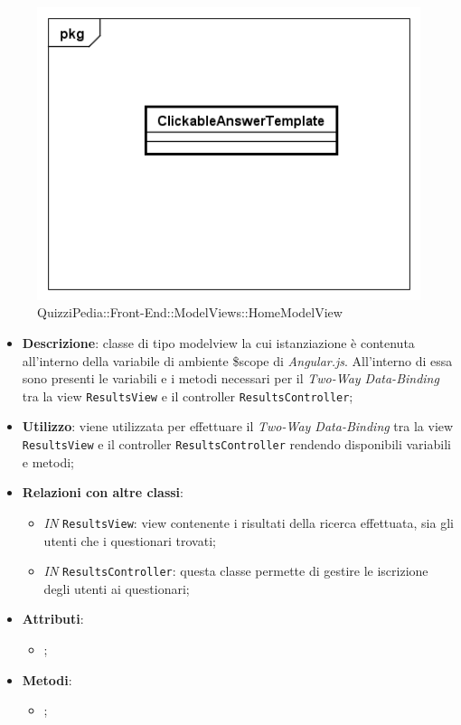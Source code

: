 	\begin{figure}[ht]
		\centering
		\includegraphics[scale=0.5,keepaspectratio]{UML/Classi/Front-End/QuizziPedia_Front-end_Templates_ClickableAnswerTemplate.png}
		\caption{QuizziPedia::Front-End::ModelViews::HomeModelView}
	\end{figure} \FloatBarrier
	
	\begin{itemize}
		\item \textbf{Descrizione}: classe di tipo modelview la cui istanziazione è contenuta all'interno della variabile di ambiente \$scope di \textit{Angular.js}. All'interno di essa sono presenti le variabili e i metodi necessari per il \textit{Two-Way Data-Binding} tra la view \texttt{ResultsView} e il controller \texttt{ResultsController};
		\item \textbf{Utilizzo}: viene utilizzata per effettuare il \textit{Two-Way Data-Binding} tra la view \texttt{ResultsView} e il controller \texttt{ResultsController} rendendo disponibili variabili e metodi;
		\item \textbf{Relazioni con altre classi}: 
		\begin{itemize}
			\item \textit{IN} \texttt{ResultsView}: view contenente i risultati della ricerca effettuata, sia gli utenti che i questionari trovati; 
			\item \textit{IN} \texttt{ResultsController}: questa classe permette di gestire le iscrizione degli utenti ai questionari;
		\end{itemize}
		\item \textbf{Attributi}: 
		\begin{itemize}
			\item ;
		\end{itemize}
		\item \textbf{Metodi}: 
		\begin{itemize}
			\item ;
		\end{itemize}
	\end{itemize}
	
